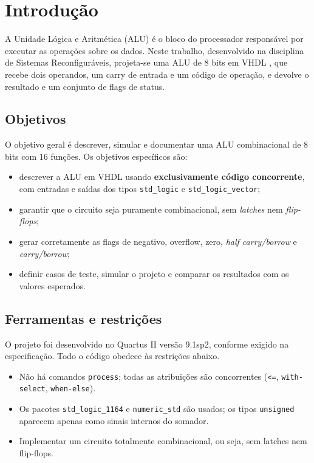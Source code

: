 \chapter{Introdução}
\label{cap:introducao}

A Unidade Lógica e Aritmética (ALU) é o bloco do processador responsável por executar as operações sobre os dados. Neste trabalho, desenvolvido na disciplina de Sistemas Reconfiguráveis, projeta-se uma ALU de 8 bits em VHDL \cite{ashenden2008,pedroni2010}, que recebe dois operandos, um carry de entrada e um código de operação, e devolve o resultado e um conjunto de flags de status.

\section{Objetivos}

O objetivo geral é descrever, simular e documentar uma ALU combinacional de 8 bits com 16 funções. Os objetivos específicos são:

\begin{itemize}
  \item descrever a ALU em VHDL usando \textbf{exclusivamente código concorrente}, com entradas e saídas dos tipos \texttt{std\_logic} e \texttt{std\_logic\_vector};
  \item garantir que o circuito seja puramente combinacional, sem \textit{latches} nem \textit{flip-flops};
  \item gerar corretamente as flags de negativo, overflow, zero, \textit{half carry/borrow} e \textit{carry/borrow};
  \item definir casos de teste, simular o projeto e comparar os resultados com os valores esperados.
\end{itemize}

\section{Ferramentas e restrições}

O projeto foi desenvolvido no Quartus II versão 9.1sp2, conforme exigido na especificação. Todo o código obedece às restrições abaixo.

\begin{itemize}
  \item Não há comandos \texttt{process}; todas as atribuições são concorrentes (\texttt{<=}, \texttt{with-select}, \texttt{when-else}).
  \item Os pacotes \texttt{std\_logic\_1164} e \texttt{numeric\_std} são usados; os tipos \texttt{unsigned} aparecem apenas como sinais internos do somador.
  \item Implementar um circuito totalmente combinacional, ou seja, sem latches nem flip-flops.
\end{itemize}

